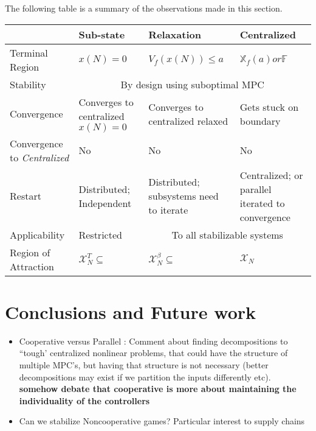 \documentclass[10pt, twocolumn]{article}
\theoremstyle{definition}
\begin{document}
The following table is a summary of the observations made in this  section.
\begin{table*}
 \label{tab:summary}
 \begin{center}
  
  
  \begin{tabular}{|p{}|p{}p{}p{}|}\hline\hline
   &Sub-state&Relaxation&Centralized\\ \hline
   Terminal Region & $x(N) = 0$ & $V_f(x(N))\leq a$& 
$\mathbb{X}_f(a)
   or \mathbb{F}$\\ \hline
   Stability & \multicolumn{3}{c}{By design using {suboptimal MPC}}\\ \hline
   Convergence & Converges to centralized $x(N)=0$& Converges to centralized relaxed&Gets stuck on boundary \\ \hline
   Convergence to \textit{Centralized}&No&No&No  \\ \hline
   Restart&Distributed; {Independent}& Distributed; {subsystems need
     to iterate}&Centralized; or parallel iterated to convergence \\ \hline
   Applicability& {Restricted}&\multicolumn{2}{c}{{To all stabilizable systems}} \\ \hline
   Region of Attraction& $\mathcal{X}_N^T$\hfill $ \subseteq$&$\mathcal{X}_{N}^{{\beta}}$\hfill$\subseteq$&$\mathcal{X}_N$\\
   \hline
   \hline
   \end{tabular}
 \end{center} 
\end{table*}


\section{Conclusions and Future work}
\begin{itemize}
\item Cooperative versus Parallel : Comment about finding
  decompositions to ``tough' centralized nonlinear problems, that
  could have the structure of multiple MPC's, but having that
  structure is not necessary (better decompositions may exist if we
  partition the inputs differently etc).
  \textbf{somehow debate that cooperative is more about maintaining
    the individuality of the controllers}
\item Can we stabilize Noncooperative games? Particular interest to
  supply chains
\end{itemize}

{\scriptsize

}
\end{document}

